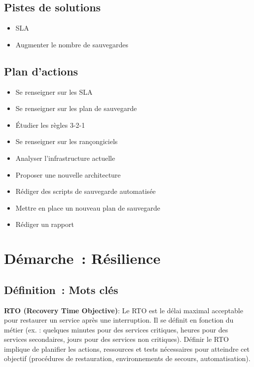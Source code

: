 \subsection*{Pistes de solutions}
{}
\begin{itemize}
	\item SLA
	\item Augmenter le nombre de sauvegardes
\end{itemize}

\subsection*{Plan d'actions}
{}
\begin{itemize}
	\item Se renseigner sur les SLA
	\item Se renseigner sur les plan de sauvegarde
	\item Étudier les règles 3-2-1
	\item Se renseigner sur les rançongiciels
	\item Analyser l'infrastructure actuelle
	\item Proposer une nouvelle architecture
	\item Rédiger des scripts de sauvegarde automatisée
	\item Mettre en place un nouveau plan de sauvegarde
	\item Rédiger un rapport
\end{itemize}

\newpage
\section*{Démarche~: Résilience}


\subsection*{Définition~: Mots clés}
{}


\noindent \textbf{RTO (Recovery Time Objective)}:
Le RTO est le délai maximal acceptable pour restaurer un service après une interruption. Il se définit en fonction du métier (ex. : quelques minutes pour des services critiques, heures pour des services secondaires, jours pour des services non critiques). Définir le RTO implique de planifier les actions, ressources et tests nécessaires pour atteindre cet objectif (procédures de restauration, environnements de secours, automatisation).

